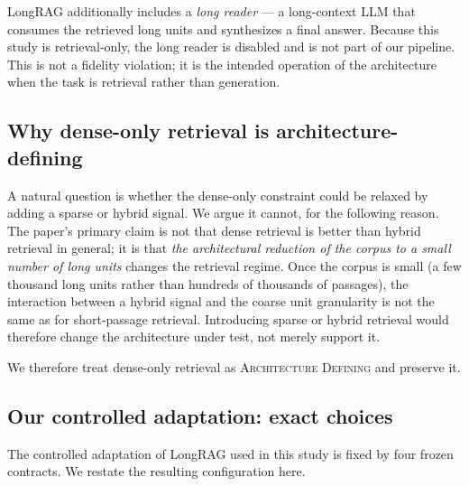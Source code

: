 \documentclass[11pt,a4paper]{article}
\begin{document}
LongRAG additionally includes a \emph{long reader} --- a
long-context LLM that consumes the retrieved long units and
synthesizes a final answer. Because this study is retrieval-only,
the long reader is disabled and is not part of our pipeline. This
is not a fidelity violation; it is the intended operation of the
architecture when the task is retrieval rather than generation.

\subsection{Why dense-only retrieval is architecture-defining}
A natural question is whether the dense-only constraint could be
relaxed by adding a sparse or hybrid signal. We argue it cannot,
for the following reason. The paper's primary claim is not that
dense retrieval is better than hybrid retrieval in general; it is
that \emph{the architectural reduction of the corpus to a small
number of long units} changes the retrieval regime. Once the
corpus is small (a few thousand long units rather than hundreds of
thousands of passages), the interaction between a hybrid signal and
the coarse unit granularity is not the same as for short-passage
retrieval. Introducing sparse or hybrid retrieval would therefore
change the architecture under test, not merely support it.

We therefore treat dense-only retrieval as \textsc{Architecture
Defining} and preserve it.

\subsection{Our controlled adaptation: exact choices}
\label{sec:adaptation}

The controlled adaptation of LongRAG used in this study is fixed by
four frozen contracts. We restate the resulting configuration here.
\end{document}
